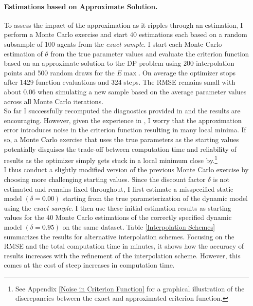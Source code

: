 \paragraph{Estimations based on Approximate Solution.}
To assess the impact of the approximation as it ripples through an estimation, I perform a Monte Carlo exercise and start 40 estimations each based on a random subsample of 100 agents from the \textit{exact sample}. I start each Monte Carlo estimation of $\theta$ from the true parameter values and evaluate the criterion function based on an approximate solution to the DP problem using 200 interpolation points and 500 random draws for the $E\max$. On average the optimizer stops after 1429 function evaluations and 324 steps. The RMSE remains small with about 0.06 when simulating a new sample based on the average parameter values across all Monte Carlo iterations. \\\newline
%
So far I successfully recomputed the diagnostics provided in \citet{Keane.1994} and the results are encouraging. However, given the experience in \citet{Eisenhauer.2015b}, I worry that the approximation error introduces noise in the criterion function resulting in many local minima. If so, a Monte Carlo exercise that uses the true parameters as the starting values potentially disguises the trade-off between computation time and reliability of results as the optimizer simply gets stuck in a local minimum close by.\footnote{See Appendix \ref{Noise in Criterion Function} for a graphical illustration of the discrepancies between the exact and approximated criterion function.}\\\newline
%
I thus conduct a slightly modified version of the previous Monte Carlo exercise by choosing more challenging starting values. Since the discount factor $\delta$ is not estimated and remains fixed throughout, I first estimate a misspecified static model $(\delta = 0.00)$ starting from the true parameterization of the dynamic model using the \textit{exact sample}. I then use these initial estimation results as starting values for the 40 Monte Carlo estimations of the correctly specified dynamic model $(\delta = 0.95)$ on the same dataset. Table \ref{Interpolation Schemes} summarizes the results for alternative interpolation schemes. Focusing on the RMSE and the total computation time in minutes, it shows how the accuracy of results increases with the refinement of the interpolation scheme. However, this comes at the cost of steep increases in computation time.

